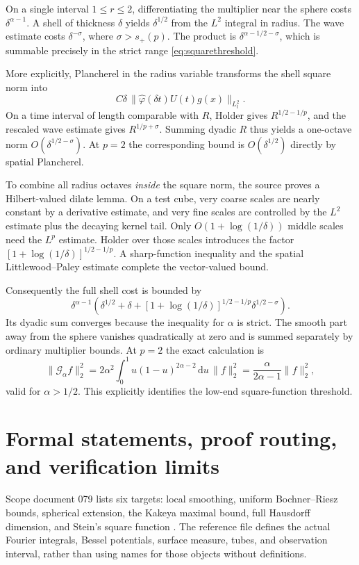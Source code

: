 \documentclass[11pt,a4paper]{article}
\numberwithin{equation}{section}
\theoremstyle{definition}
\theoremstyle{remark}
\newcommand{\dd}{\,\mathrm d}
\begin{document}
On a single interval $1\le r\le2$, differentiating the multiplier near the
sphere costs $\delta^{\alpha-1}$. A shell of thickness $\delta$ yields
$\delta^{1/2}$ from the $L^2$ integral in radius. The wave estimate costs
$\delta^{-\sigma}$, where $\sigma>s_+(p)$. The product is
$\delta^{\alpha-1/2-\sigma}$, which is summable precisely in the strict range
\eqref{eq:squarethreshold}.

More explicitly, Plancherel in the radius variable transforms the shell
square norm into
\[
 C\delta\,
 \|\widehat\varphi(\delta t)U(t)g(x)\|_{L^2_t}.
\]
On a time interval of length comparable with $R$, Holder gives
$R^{1/2-1/p}$, and the rescaled wave estimate gives
$R^{1/p+\sigma}$. Summing dyadic $R$ thus yields a one-octave norm
$O(\delta^{1/2-\sigma})$. At $p=2$ the corresponding bound is
$O(\delta^{1/2})$ directly by spatial Plancherel.

To combine all radius octaves \emph{inside} the square norm, the source proves
a Hilbert-valued dilate lemma. On a test cube, very coarse scales are nearly
constant by a derivative estimate, and very fine scales are controlled by the
$L^2$ estimate plus the decaying kernel tail. Only
$O(1+\log(1/\delta))$ middle scales need the $L^p$ estimate. Holder over
those scales introduces the factor
$[1+\log(1/\delta)]^{1/2-1/p}$. A sharp-function inequality and the spatial
Littlewood--Paley estimate complete the vector-valued bound.

Consequently the full shell cost is bounded by
\[
 \delta^{\alpha-1}
 \left(\delta^{1/2}+\delta+
 [1+\log(1/\delta)]^{1/2-1/p}\delta^{1/2-\sigma}\right).
\]
Its dyadic sum converges because the inequality for $\alpha$ is strict.
The smooth part away from the sphere vanishes quadratically at zero and is
summed separately by ordinary multiplier bounds. At $p=2$ the exact calculation
is
\[
 \|\mathcal G_\alpha f\|_2^2
 =2\alpha^2\int_0^1u(1-u)^{2\alpha-2}\dd u\,\|f\|_2^2
 =\frac{\alpha}{2\alpha-1}\|f\|_2^2,
\]
valid for $\alpha>1/2$. This explicitly identifies the low-end square-function
threshold.

\section{Formal statements, proof routing, and verification limits}
\label{sec:formal}
Scope document 079 lists six targets: local smoothing, uniform Bochner--Riesz
bounds, spherical extension, the Kakeya maximal bound, full Hausdorff dimension,
and Stein's square function \cite{scope}. The reference file defines the actual
Fourier integrals, Bessel potentials, surface measure, tubes, and observation
interval, rather than using names for those objects without definitions.
\end{document}
